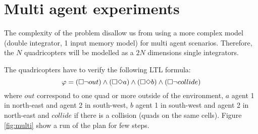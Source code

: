 \section{Multi agent experiments}
The complexity of the problem disallow us from using a more complex model (double integrator, 1 input memory model) for multi agent scenarios.
Therefore, the $N$ quadricopters will be modelled as a $2N$ dimensions single integrators.

The quadricopters have to verify the following LTL formula:
$$ \varphi = (\square \neg out) \wedge (\square \Diamond a) \wedge (\square \Diamond b) \wedge (\square \neg collide)$$
where $out$ correspond to one quad or more outside of the environment, $a$ agent 1 in north-east and agent 2 in south-west, $b$ agent 1 in south-west and agent 2 in north-east and $collide$ if there is a collision (quads on the same cells).
Figure \ref{fig:multi} show a run of the plan for few steps.

